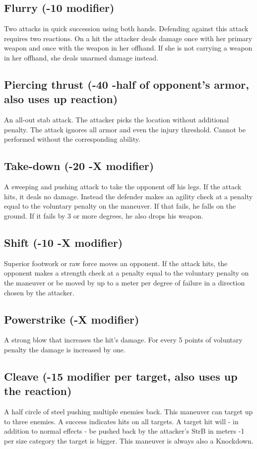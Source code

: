 \subsection*{Flurry (-10 modifier)}
Two attacks in quick succession using both hands. Defending against this attack requires two reactions. On a hit the attacker deals damage once with her primary weapon and once with the weapon in her offhand. If she is not carrying a weapon in her offhand, she deals unarmed damage instead. 
\subsection*{Piercing thrust (-40 -half of opponent’s armor, also uses up reaction)}
An all-out stab attack. The attacker picks the location without additional penalty. The attack ignores all armor and even the injury threshold. Cannot be performed without the corresponding ability.
\subsection*{Take-down (-20 -X modifier)}
A sweeping and pushing attack to take the opponent off his legs. If the attack hits, it deals no damage. Instead the defender makes an agility check at a penalty equal to the voluntary penalty on the maneuver. If that fails, he falls on the ground. If it fails by 3 or more degrees, he also drops his weapon.
\subsection*{Shift (-10 -X modifier)}
Superior footwork or raw force moves an opponent. If the attack hits, the opponent makes a strength check at a penalty equal to the voluntary penalty on the maneuver or be moved by up to a meter per degree of failure in a direction chosen by the attacker.
\subsection*{Powerstrike (-X modifier)}
A strong blow that increases the hit’s damage. For every 5 points of voluntary penalty the damage is increased by one.
\subsection*{Cleave (-15 modifier per target, also uses up the reaction)}
A half circle of steel pushing multiple enemies back. This maneuver can target up to three enemies. A success indicates hits on all targets. A target hit will - in addition to normal effects - be pushed back by the attacker’s StrB in meters -1 per size category the target is bigger. This maneuver is always also a Knockdown.
